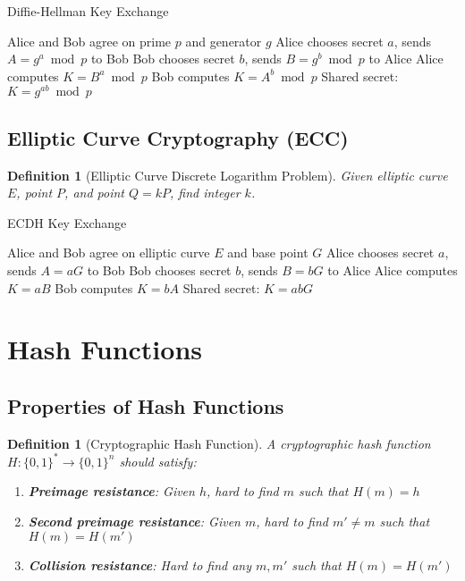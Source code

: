 \documentclass[11pt,a4paper]{article}
\newtheorem{definition}[theorem]{Definition}
\begin{document}
\begin{algorithm}
\caption{Diffie-Hellman Key Exchange}
\begin{algorithmic}[1]
\STATE Alice and Bob agree on prime $p$ and generator $g$
\STATE Alice chooses secret $a$, sends $A = g^a \bmod p$ to Bob
\STATE Bob chooses secret $b$, sends $B = g^b \bmod p$ to Alice
\STATE Alice computes $K = B^a \bmod p$
\STATE Bob computes $K = A^b \bmod p$
\STATE Shared secret: $K = g^{ab} \bmod p$
\end{algorithmic}
\end{algorithm}

\subsection{Elliptic Curve Cryptography (ECC)}

\begin{definition}[Elliptic Curve Discrete Logarithm Problem]
Given elliptic curve $E$, point $P$, and point $Q = kP$, find integer $k$.
\end{definition}

\begin{algorithm}
\caption{ECDH Key Exchange}
\begin{algorithmic}[1]
\STATE Alice and Bob agree on elliptic curve $E$ and base point $G$
\STATE Alice chooses secret $a$, sends $A = aG$ to Bob
\STATE Bob chooses secret $b$, sends $B = bG$ to Alice
\STATE Alice computes $K = aB$
\STATE Bob computes $K = bA$
\STATE Shared secret: $K = abG$
\end{algorithmic}
\end{algorithm}

\section{Hash Functions}

\subsection{Properties of Hash Functions}

\begin{definition}[Cryptographic Hash Function]
A cryptographic hash function $H: \{0,1\}^* \rightarrow \{0,1\}^n$ should satisfy:
\begin{enumerate}
\item \textbf{Preimage resistance}: Given $h$, hard to find $m$ such that $H(m) = h$
\item \textbf{Second preimage resistance}: Given $m$, hard to find $m' \neq m$ such that $H(m) = H(m')$
\item \textbf{Collision resistance}: Hard to find any $m, m'$ such that $H(m) = H(m')$
\end{enumerate}
\end{definition}
\end{document}
